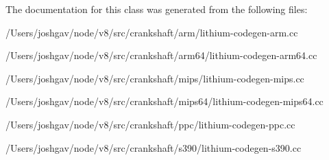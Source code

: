 The documentation for this class was generated from the following files\+:\begin{DoxyCompactItemize}
\item 
/\+Users/joshgav/node/v8/src/crankshaft/arm/lithium-\/codegen-\/arm.\+cc\item 
/\+Users/joshgav/node/v8/src/crankshaft/arm64/lithium-\/codegen-\/arm64.\+cc\item 
/\+Users/joshgav/node/v8/src/crankshaft/mips/lithium-\/codegen-\/mips.\+cc\item 
/\+Users/joshgav/node/v8/src/crankshaft/mips64/lithium-\/codegen-\/mips64.\+cc\item 
/\+Users/joshgav/node/v8/src/crankshaft/ppc/lithium-\/codegen-\/ppc.\+cc\item 
/\+Users/joshgav/node/v8/src/crankshaft/s390/lithium-\/codegen-\/s390.\+cc\end{DoxyCompactItemize}

